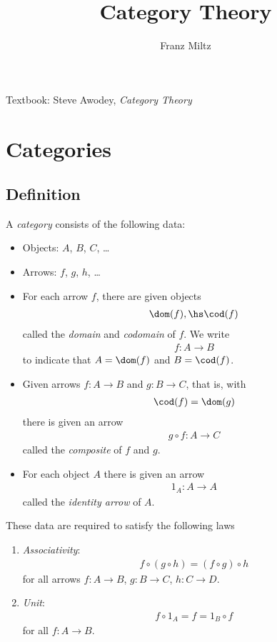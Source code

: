 \documentclass{article}
\begin{document}
\mkawodeythms
\title{Category Theory}
\author{Franz Miltz}
\maketitle
\noindent Textbook: Steve Awodey, \emph{Category Theory}
\tableofcontents
\pagebreak

\section{Categories}

\subsection{Definition}

\begin{definition}
	A \emph{category} consists of the following data:
	\begin{itemize}
		\item Objects: $A$, $B$, $C$, \dots
		\item Arrows: $f$, $g$, $h$, \dots
		\item For each arrow $f$, there are given objects \begin{align*}
			      \dom(f),\hs \cod(f)
		      \end{align*}
		      called the \emph{domain} and \emph{codomain} of $f$. We write
		      \begin{align*}
			      f:A\to B
		      \end{align*}
		      to indicate that $A=\dom(f)$ and $B=\cod(f)$.
		\item Given arrows $f:A\to B$ and $g:B\to C$, that is, with \begin{align*}
			      \cod(f) = \dom(g)
		      \end{align*}
		      there is given an arrow
		      \begin{align*}
			      g\circ f: A\to C
		      \end{align*}
		      called the \emph{composite} of $f$ and $g$.
		\item For each object $A$ there is given an arrow \begin{align*}
			      1_A : A\to A
		      \end{align*}
		      called the \emph{identity arrow} of $A$.
	\end{itemize}
	These data are required to satisfy the following laws \begin{enumerate}[label=C\arabic*.]
		\item \emph{Associativity}: \begin{align*}
			      f \circ (g \circ h) = (f\circ g) \circ h
		      \end{align*}
		      for all arrows $f:A\to B$, $g:B\to C$, $h:C\to D$.
		\item \emph{Unit}: \begin{align*}
			      f \circ 1_A = f = 1_B \circ f
		      \end{align*}
		      for all $f:A\to B$.
	\end{enumerate}
\end{definition}
\end{document}
